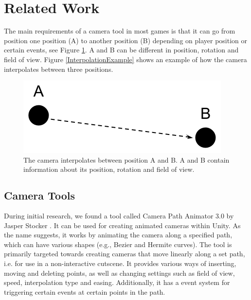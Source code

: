 \section{Related Work}\label{relatedWork}

The main requirements of a camera tool in most games is that it can go from position one position (A) to another  position (B) depending on player position or certain events, see Figure \ref{fig:CameraSystem_BASIC}. A and B can be different in position, rotation and field of view.
Figure \ref{InterpolationExample} shows an example of how the camera interpolates between three positions.

\begin{figure}[htbp]
\centering
\includegraphics[width=.4\textwidth]{Pics/CameraSystem_BASIC}
\caption{The camera interpolates between position A and B. A and B contain information about its position, rotation and field of view.}
\label{fig:CameraSystem_BASIC}
\end{figure}

\subsection{Camera Tools}

During initial research, we found a tool called Camera Path Animator 3.0 by Jasper Stocker  \cite{unity_camTool}. It can be used for creating animated cameras within Unity. As the name suggests, it works by animating the camera along a specified path, which can have various shapes (e.g., Bezier and Hermite curves). The tool is primarily targeted towards creating cameras that move linearly along a set path, i.e. for use in a non-interactive cutscene. It provides various ways of inserting, moving and deleting points, as well as changing settings such as field of view, speed, interpolation type and easing. Additionally, it has a event system for triggering certain events at certain points in the path.

